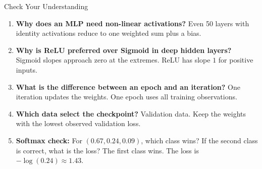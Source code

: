 \begin{frame}{Check Your Understanding}
    \small
    \begin{enumerate}
        \item \textbf{Why does an MLP need non-linear activations?} \pause Even 50 layers with identity activations reduce to one weighted sum plus a bias.
        \item \textbf{Why is ReLU preferred over Sigmoid in deep hidden layers?} \pause Sigmoid slopes approach zero at the extremes. ReLU has slope $1$ for positive inputs.
        \item \textbf{What is the difference between an epoch and an iteration?} \pause One iteration updates the weights. One epoch uses all training observations.
        \item \textbf{Which data select the checkpoint?} \pause Validation data. Keep the weights with the lowest observed validation loss.
        \item \textbf{Softmax check:} For $(0.67,0.24,0.09)$, which class wins? If the second class is correct, what is the loss? \pause The first class wins. The loss is $-\log(0.24)\approx1.43$.
    \end{enumerate}
\end{frame}
